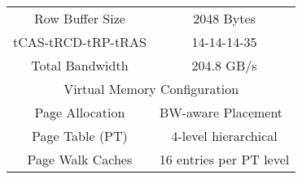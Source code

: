 \begin {table}[h]
\begin{center}
\begin{tabular}{|c|c|}
     Row Buffer Size      &  2048 Bytes              \\
     \small{tCAS-tRCD-tRP-tRAS}   &  14-14-14-35     \\ 
     Total Bandwidth      &  204.8 GB/s               \\ \hline
     \multicolumn{2}{|c|}{Virtual Memory Configuration}     \\ \hline
     Page Allocation      &  BW-aware Placement~\cite{batman,bwa}  \\ 
     Page Table (PT)      &  4-level hierarchical    \\ 
     Page Walk Caches     &  16 entries per PT level       \\ \hline

\end{tabular}
\label{table:method_system}
\vspace{-0.3in}
\end{center}
\normalsize
\end{table}
